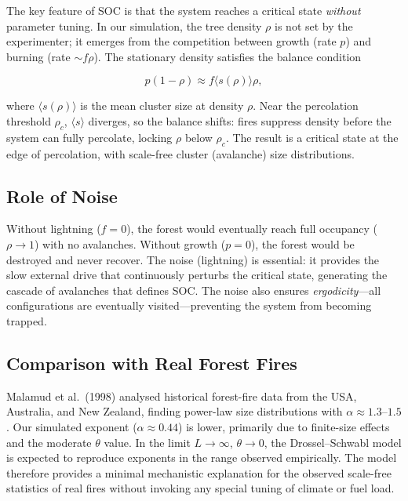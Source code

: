 \documentclass[12pt,a4paper]{article}
\begin{document}
The key feature of SOC is that the system reaches a critical state
\emph{without} parameter tuning.
In our simulation, the tree density $\rho$ is not set by the experimenter;
it emerges from the competition between growth (rate $p$) and burning
(rate $\sim f\rho$).
The stationary density satisfies the balance condition

\begin{equation}
  p(1-\rho) \approx f \langle s(\rho) \rangle \rho,
\end{equation}

where $\langle s(\rho) \rangle$ is the mean cluster size at density $\rho$.
Near the percolation threshold $\rho_c$, $\langle s \rangle$ diverges,
so the balance shifts: fires suppress density before the system can
fully percolate, locking $\rho$ below $\rho_c$.
The result is a critical state at the edge of percolation, with
scale-free cluster (avalanche) size distributions.

\subsection{Role of Noise}

Without lightning ($f=0$), the forest would eventually reach full occupancy
($\rho \to 1$) with no avalanches.
Without growth ($p=0$), the forest would be destroyed and never recover.
The noise (lightning) is essential: it provides the slow external drive
that continuously perturbs the critical state, generating the cascade of
avalanches that defines SOC.
The noise also ensures \emph{ergodicity}---all configurations are eventually
visited---preventing the system from becoming trapped.

\subsection{Comparison with Real Forest Fires}

Malamud et al.\ (1998) analysed historical forest-fire data from the USA,
Australia, and New Zealand, finding power-law size distributions with
$\alpha \approx 1.3$--$1.5$ \cite{Malamud1998}.
Our simulated exponent ($\alpha \approx 0.44$) is lower, primarily due to
finite-size effects and the moderate $\theta$ value.
In the limit $L\to\infty$, $\theta\to 0$, the Drossel--Schwabl model is
expected to reproduce exponents in the range observed empirically.
The model therefore provides a minimal mechanistic explanation for the
observed scale-free statistics of real fires without invoking any
special tuning of climate or fuel load.
\end{document}
